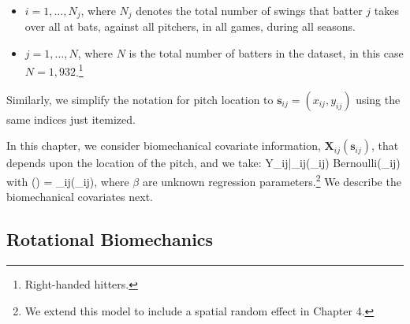 \begin{itemize}

\item $i  = 1,\ldots,N_j$, where $N_j$ denotes the total number of swings that batter $j$ takes over all at bats, against all pitchers, in all games, during all seasons.

\item $j = 1,\ldots,N$, where $N$ is the total number of batters in the dataset, in this case $N = 1,932$.\footnote{Right-handed hitters.}

\end{itemize}

Similarly, we simplify the notation for pitch location to $\mathbf{s}_{ij} = (x_{ij},y_{ij})$ using the same indices just itemized.

In this chapter, we consider biomechanical covariate information, $\mathbf{X}_{ij}(\mathbf{s}_{ij})$, that depends upon the location of the pitch, and we take:
\bdm
Y_{ij}|_{ij}(_{ij})  \mbox{Bernoulli}(\pi_{ij})
\edm
with
\bdm
\log\left(\right) = _{ij}(_{ij})\beta,
\edm
where $\beta$ are unknown regression parameters.\footnote{We extend this model to include a spatial random effect in Chapter 4.}  We describe the biomechanical covariates next.

\subsection{Rotational Biomechanics} %

